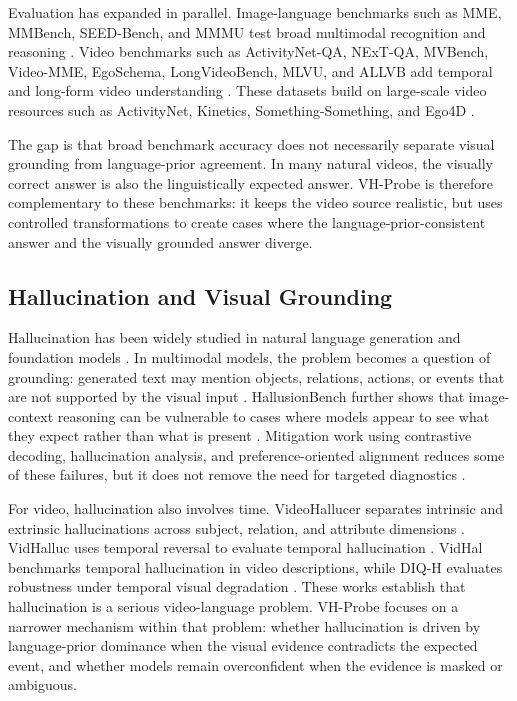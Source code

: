 \documentclass[final,5p,times,twocolumn]{elsarticle}
\begin{document}
Evaluation has expanded in parallel. Image-language benchmarks such as MME,
MMBench, SEED-Bench, and MMMU test broad multimodal recognition and reasoning
\cite{fu2026mme,liu2024mmbench,li2023seed,yue2024mmmu}. Video benchmarks such
as ActivityNet-QA, NExT-QA, MVBench, Video-MME, EgoSchema, LongVideoBench,
MLVU, and ALLVB add temporal and long-form video understanding
\cite{yu2019activitynet,xiao2021next,li2024mvbench,fu2025video,mangalam2023egoschema,wu2024longvideobench,zhou2025mlvu,tan2025allvb}.
These datasets build on large-scale video resources such as ActivityNet,
Kinetics, Something-Something, and Ego4D
\cite{caba2015activitynet,kay2017kinetics,goyal2017something,grauman2022ego4d}.

The gap is that broad benchmark accuracy does not necessarily separate visual
grounding from language-prior agreement. In many natural videos, the visually correct
answer is also the linguistically expected answer. VH-Probe is therefore
complementary to these benchmarks: it keeps the video source realistic, but
uses controlled transformations to create cases where the language-prior-consistent answer
and the visually grounded answer diverge.

\subsection{Hallucination and Visual Grounding}

Hallucination has been widely studied in natural language generation and
foundation models \cite{ji2023survey,rawte2023survey}. In multimodal models,
the problem becomes a question of grounding: generated text may mention
objects, relations, actions, or events that are not supported by the visual
input \cite{rohrbach2018object,li2023evaluating,bai2024hallucination}.
HallusionBench further shows that image-context reasoning can be vulnerable to
cases where models appear to see what they expect rather than what is present
\cite{liu2023hallusionbench}. Mitigation work using contrastive decoding,
hallucination analysis, and preference-oriented alignment reduces some of these
failures, but it does not remove the need for targeted diagnostics
\cite{leng2024mitigating,zhou2024analyzing,sarkar2025mitigating}.

For video, hallucination also involves time. VideoHallucer separates intrinsic
and extrinsic hallucinations across subject, relation, and attribute dimensions
\cite{wang2024videohallucer}. VidHalluc uses temporal reversal to evaluate
temporal hallucination \cite{li2025vidhalluc}. VidHal benchmarks temporal
hallucination in video descriptions, while DIQ-H evaluates robustness under
temporal visual degradation \cite{choong2024vidhal,wan2025value}. These works
establish that hallucination is a serious video-language problem. VH-Probe
focuses on a narrower mechanism within that problem: whether hallucination is
driven by language-prior dominance when the visual evidence contradicts the
expected event, and whether models remain overconfident when the evidence is
masked or ambiguous.
\end{document}

